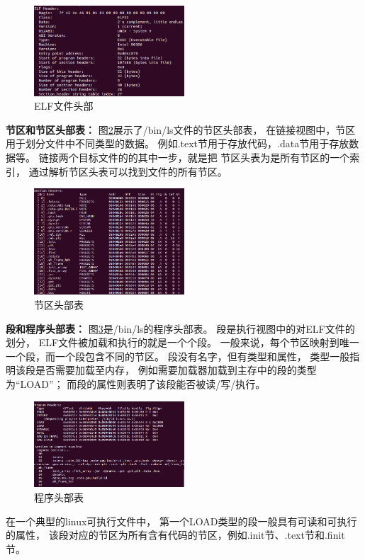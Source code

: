 \begin{figure}[h!]
  \centering
  \includegraphics[width=0.5\textwidth]{figure/header.png}
  \caption{ELF文件头部}
  \label{header}
\end{figure}

\textbf{节区和节区头部表：}
图\ref{sections}展示了/bin/ls文件的节区头部表，
在链接视图中，节区用于划分文件中不同类型的数据。
例如.text节用于存放代码，.data节用于存放数据等。
链接两个目标文件的的其中一步，就是把
节区头表为是所有节区的一个索引，
通过解析节区头表可以找到文件的所有节区。

\begin{figure}[h!]
  \centering
  \includegraphics[width=0.5\textwidth]{figure/sections.png}
  \caption{节区头部表}
  \label{sections}
\end{figure}

\textbf{段和程序头部表：}
图\ref{programs}是/bin/ls的程序头部表。
段是执行视图中的对ELF文件的划分，
ELF文件被加载和执行的就是一个个段。
一般来说，每个节区映射到唯一一个段，而一个段包含不同的节区。
段没有名字，但有类型和属性，
类型一般指明该段是否需要加载至内存，
例如需要加载器加载到主存中的段的类型为“LOAD”；
而段的属性则表明了该段能否被读/写/执行。

\begin{figure}[h!]
  \centering
  \includegraphics[width=0.5\textwidth]{figure/programs.png}
  \caption{程序头部表}
  \label{programs}
\end{figure}
在一个典型的linux可执行文件中，
第一个LOAD类型的段一般具有可读和可执行的属性，
该段对应的节区为所有含有代码的节区，例如.init节、.text节和.finit节。

